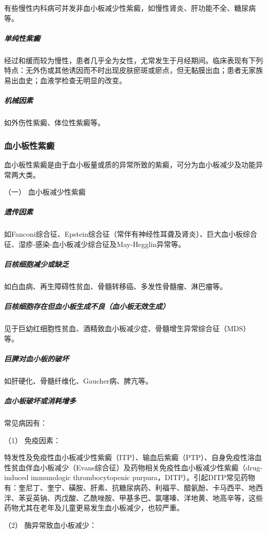 有些慢性内科病可并发非血小板减少性紫癜，如慢性肾炎、肝功能不全、糖尿病等。

\subparagraph{单纯性紫癜}

经过和缓而较为慢性，患者几乎全为女性，尤常发生于月经期间。临床表现有下列特点：无外伤或其他诱因而不时出现皮肤瘀斑或瘀点，但无黏膜出血；患者无家族易出血史；血液学检查无明显的改变。

\subparagraph{机械因素}

如外伤性紫癜、体位性紫癜等。

\subsubsection{血小板性紫癜}

血小板性紫癜是由于血小板量或质的异常所致的紫癜，可分为血小板减少及功能异常两大类。

\hypertarget{text00036.htmlux5cux23CHP1-14-1-2-1}{}
（一） 血小板减少性紫癜

\subparagraph{遗传因素}

如Fanconi综合征、Epstein综合征（常伴有神经性耳聋及肾炎）、巨大血小板综合征、湿疹-感染-血小板减少综合征及May-Hegglin异常等。

\subparagraph{巨核细胞减少或缺乏}

如白血病、再生障碍性贫血、骨髓转移癌、多发性骨髓瘤、淋巴瘤等。

\subparagraph{巨核细胞存在但血小板生成不良（血小板无效生成）}

见于巨幼红细胞性贫血、酒精致血小板减少症、骨髓增生异常综合征（MDS）等。

\subparagraph{巨脾对血小板的破坏}

如肝硬化、骨髓纤维化、Gaucher病、脾亢等。

\subparagraph{血小板破坏或消耗增多}

常见病因有：

\hypertarget{text00036.htmlux5cux23CHP1-14-1-2-1-5-1}{}
（1） 免疫因素：

特发性及免疫性血小板减少性紫癜（ITP）、输血后紫癜（PTP）、自身免疫性溶血性贫血伴血小板减少（Evans综合征）及药物相关免疫性血小板减少性紫癜（drug-induced
immunologic thrombocytopenic
purpura，DITP）。引起DITP常见药物有：奎尼丁、奎宁、磺胺、肝素、抗糖尿病药、利福平、醋氨酚、卡马西平、地西泮、苯妥英钠、丙戊酸、乙酰唑胺、甲基多巴、氯噻嗪、洋地黄、地高辛等，这些药物尤其在老年及儿童更易发生血小板减少，也较严重。

\hypertarget{text00036.htmlux5cux23CHP1-14-1-2-1-5-2}{}
（2） 酶异常致血小板减少：

